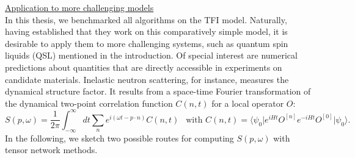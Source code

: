 \noindent \underline{Application to more challenging models} \\[0.5em]
In this thesis, we benchmarked all algorithms on the TFI model. Naturally, having established that they work on this comparatively simple model, it is desirable to apply them to more challenging systems, such as quantum spin liquids (QSL) mentioned in the introduction. Of special interest are numerical predictions about quantities that are directly accessible in experiments on candidate materials. Inelastic neutron scattering, for instance, measures the dynamical structure factor. It results from a space-time Fourier transformation of the dynamical two-point correlation function $C(n, t)$ for a local operator $O$:
\begin{equation}
	S(p, \omega) = \frac{1}{2 \pi} \int_{-\infty}^{\infty} dt \sum_n e^{i(\omega t - p \cdot n)} C(n, t) 
	\:\: \text{ with } C(n, t) = \langle \psi_0 \vert e^{iHt} O^{[n]} e^{-iHt} O^{[0]} \vert \psi_0 \rangle.
\end{equation}
In the following, we sketch two possible routes for computing $S(p, \omega)$ with tensor network methods.
